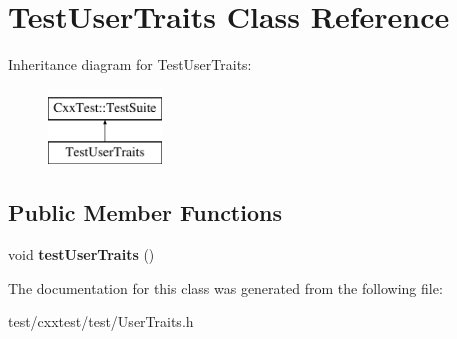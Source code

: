 \hypertarget{classTestUserTraits}{\section{Test\-User\-Traits Class Reference}
\label{classTestUserTraits}
}
Inheritance diagram for Test\-User\-Traits\-:\begin{figure}[H]
\begin{center}
\leavevmode
\includegraphics[height=2.000000cm]{classTestUserTraits}
\end{center}
\end{figure}
\subsection*{Public Member Functions}
\begin{DoxyCompactItemize}
\item 
\hypertarget{classTestUserTraits_a896a477c7f4ec9b454e552712e2740a2}{void {\bfseries test\-User\-Traits} ()}\label{classTestUserTraits_a896a477c7f4ec9b454e552712e2740a2}

\end{DoxyCompactItemize}


The documentation for this class was generated from the following file\-:\begin{DoxyCompactItemize}
\item 
test/cxxtest/test/User\-Traits.\-h\end{DoxyCompactItemize}
